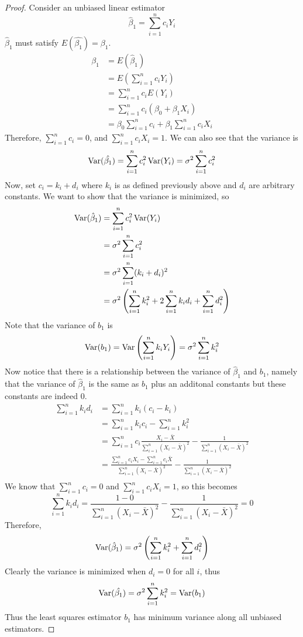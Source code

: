 \begin{proof}
    Consider an unbiased linear estimator 
    \[\hat{\beta}_1 = \sum_{i=1}^n c_iY_i\]
    $\hat{\beta}_1$ must satisfy $E(\hat{\beta_1}) = \beta_1$.
    \begin{align*}
        \beta_1 &= E(\hat{\beta}_1)\\
        &= E\left(\sum_{i=1}^n c_i Y_i\right)\\
        &= \sum_{i=1}^n c_i E(Y_i)\\
        &= \sum_{i=1}^n c_i(\beta_0 + \beta_1 X_i)\\
        &= \beta_0\sum_{i=1}^n c_i + \beta_1\sum_{i=1}^n c_iX_i  
    \end{align*}
    Therefore, $\sum\limits_{i=1}^n c_i = 0$, and $\sum\limits_{i=1}^n c_iX_i = 1$. We can also see that the variance is 
    \[\operatorname{Var}(\hat{\beta_1}) = \sum_{i=1}^n c_i^2 \operatorname{Var}(Y_i) = \sigma^2\sum_{i=1}^n c_i^2\]
    Now, set $c_i = k_i + d_i$ where $k_i$ is as defined previously above and $d_i$ are arbitrary constants. We want to show that the variance is minimized, so 
    \begin{align*}
        \operatorname{Var}(\hat{\beta}_1) &= \sum_{i=1}^n c_i^2\operatorname{Var}(Y_i)\\
        &= \sigma^2\sum_{i=1}^n c_i^2\\
        &= \sigma^2\sum_{i=1}^n (k_i + d_i)^2\\
        &= \sigma^2 \left(\sum_{i=1}^n k_i^2 + 2\sum_{i=1}^n k_id_i + \sum_{i=1}^n d_i^2\right)
    \end{align*}
    Note that the variance of $b_1$ is 
    \[\operatorname{Var}(b_1) = \operatorname{Var}\left(\sum_{i=1}^n k_iY_i\right) = \sigma^2 \sum_{i=1}^n k_i^2\]
    Now notice that there is a relationship between the variance of $\hat{\beta}_1$ and $b_1$, namely that the variance of $\hat{\beta}_1$ is the same as $b_1$ plus an additonal constants but these constants are indeed 0. 
    \begin{align*}
        \sum_{i=1}^n k_id_i &= \sum_{i=1}^n k_i(c_i - k_i)\\
        &= \sum_{i=1}^n k_ic_i - \sum_{i=1}^n k_i^2\\
        &= \sum_{i=1}^n c_i \frac{X_i - \bar{X}}{\sum_{i=1}^n (X_i - \bar{X})^2} - \frac{1}{\sum_{i=1}^n (X_i - \bar{X})^2}\\
        &= \frac{\sum_{i=1}^n c_iX_i  - \sum_{i=1}^n c_i\bar{X}}{\sum_{i=1}^n (X_i - \bar{X})^2} - \frac{1}{\sum_{i=1}^n (X_i - \bar{X})^2}\\
    \end{align*}
    We know that $\sum_{i=1}^n c_i = 0$ and $\sum_{i=1}^n c_i X_i = 1$, so this becomes
    \[\sum_{i=1}^n k_id_i = \frac{1 - 0}{\sum_{i=1}^n (X_i - \bar{X})^2} - \frac{1}{\sum_{i=1}^n (X_i - \bar{X})^2} = 0\]
    Therefore, 
    \[\operatorname{Var}(\hat{\beta}_1) = \sigma^2 \left(\sum_{i=1}^n k_i^2 + \sum_{i=1}^n d_i^2\right)\]
    Clearly the variance is minimized when $d_i = 0$ for all $i$, thus 
    \[\operatorname{Var}(\hat{\beta_1}) = \sigma^2 \sum_{i=1}^n k_i^2 = \operatorname{Var}(b_1)\]
    Thus the least squares estimator $b_1$ has minimum variance along all unbiased estimators.
\end{proof}

